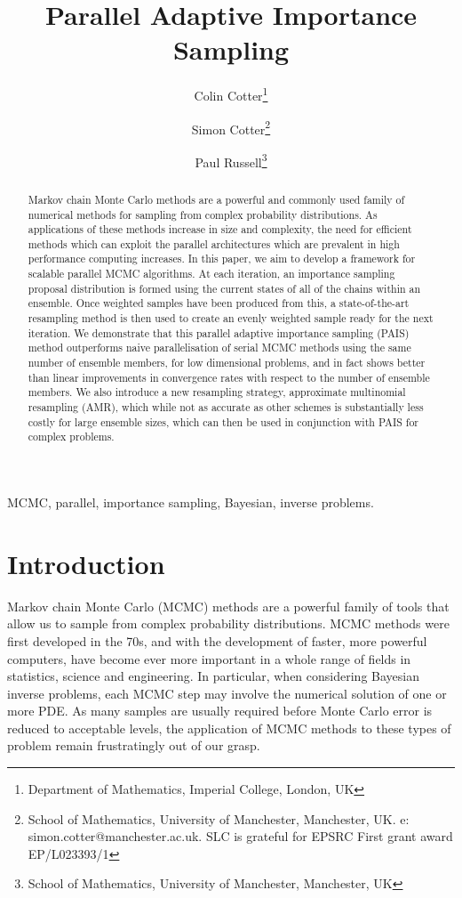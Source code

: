 \documentclass[final]{siamltex}
\author{Colin Cotter\thanks{Department of Mathematics, Imperial
    College, London, UK} \and Simon Cotter\thanks{School of
    Mathematics, University of Manchester, Manchester, UK. e:
    simon.cotter@manchester.ac.uk. SLC is grateful for EPSRC First
    grant award EP/L023393/1} \and Paul Russell\thanks{School of
    Mathematics, University of Manchester, Manchester, UK}}
\title{Parallel Adaptive Importance Sampling}
\begin{document}
\maketitle
\begin{abstract}
  Markov chain Monte Carlo methods are a powerful and commonly used
  family of numerical methods for sampling from complex probability
  distributions. As applications of these methods increase in size and
  complexity, the need for efficient methods which can exploit the
  parallel architectures which are prevalent in high performance
  computing increases. In this paper, we aim to develop a framework
  for scalable parallel MCMC algorithms. At each iteration, an
  importance sampling proposal distribution is formed using the
  current states of all of the chains within an ensemble. Once
  weighted samples have been produced from this, a state-of-the-art
  resampling method is then used to create an evenly weighted sample
  ready for the next iteration. We demonstrate that this parallel
  adaptive importance sampling (PAIS) method outperforms naive
  parallelisation of serial MCMC methods using the same number of
  ensemble members, for low dimensional problems, and in fact shows
  better than linear improvements in convergence rates with respect to
  the number of ensemble members. We also introduce a new resampling
  strategy, approximate multinomial resampling (AMR), which while not
  as accurate as other schemes is substantially less costly for large
  ensemble sizes, which can then be used in conjunction with PAIS for
  complex problems.
\end{abstract}
\begin{keywords}MCMC, parallel, importance sampling, Bayesian, inverse problems.
\end{keywords}
\section{Introduction}
Markov chain Monte Carlo (MCMC) methods are a powerful family of tools
that allow us to sample from complex probability distributions. MCMC
methods were first developed in the 70s\cite{hastings1970monte}, and
with the development of faster, more
powerful computers, have become ever more important in a whole range
of fields in statistics, science and engineering.  In particular, when
considering Bayesian inverse problems, each MCMC step may involve the
numerical solution of one or more PDE. As many samples are usually
required before Monte Carlo error is reduced to acceptable levels,
the application of MCMC methods to these types of problem remain frustratingly out of our grasp.
\end{document}
